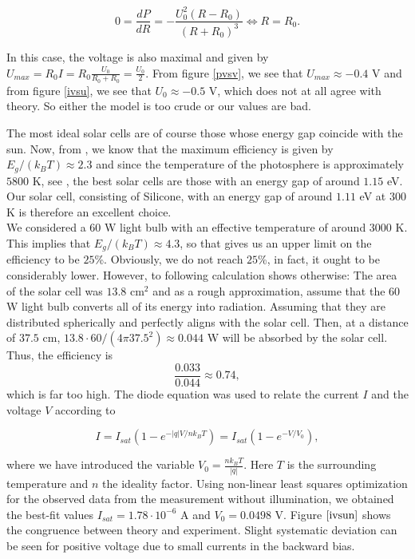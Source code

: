 \documentclass[12pt,a4paper]{article}
\begin{document}
\begin{displaymath}
  0=\frac{dP}{dR}=-\frac{U_0^2(R-R_0)}{(R+R_0)^3}\iff R=R_0.
\end{displaymath}

In this case, the voltage is also maximal and given by $U_{max}=R_0I=R_0\frac{U_0}{R_0+R_0}=\frac{U_0}{2}$.
From figure \ref{pvsv}, we see that $U_{max}\approx -0.4$ V and from figure \ref{ivsu}, we see that $U_0\approx -0.5$ V, which does not at all agree with theory. So either the model is too crude or our values are bad.

The most ideal solar cells are of course those whose energy gap coincide with the sun. Now, from \cite{lab_PM}, we know that the maximum efficiency is given by $E_g/(k_BT)\approx 2.3$ and since the temperature of the photosphere is approximately $5800$ K, see \cite{sun}, the best solar cells are those with an energy gap of around $1.15$ eV.
Our solar cell, consisting of Silicone, with an energy gap of around $1.11$ eV at $300$ K is therefore an excellent choice. \\

We considered a $60$ W light bulb with an effective temperature of around $3000$ K. This implies that $E_g/(k_B T)\approx 4.3$, so that \cite{lab_PM} gives us an upper limit on the efficiency to be $25$\%.
Obviously, we do not reach $25$\%, in fact, it ought to be considerably lower. However, to following calculation shows otherwise:
The area of the solar cell was $13.8$ cm${}^2$ and as a rough approximation, assume that the $60$ W light bulb converts all of its energy into radiation. Assuming that they are distributed spherically and perfectly aligns with the solar cell. Then, at a distance of $37.5$ cm, $13.8\cdot 60/(4\pi 37.5^2)\approx 0.044$ W will be absorbed by the solar cell.
Thus, the efficiency is
\begin{displaymath}
  \frac{0.033}{0.044}\approx 0.74,
\end{displaymath}
which is far too high.
The diode equation was used to relate the current $I$ and the voltage $V$ according to

$$I = I_{sat}\left(1-e^{-|q|V/nk_BT}\right) = I_{sat}\left(1-e^{-V/V_0}\right),$$

where we have introduced the variable $V_0 = \frac{nk_BT}{|q|}$. Here $T$ is the surrounding temperature and $n$ the ideality factor. Using non-linear least squares optimization for the observed data from the measurement without illumination, we obtained the best-fit values $I_{sat}=1.78\cdot 10^{-6}$ A and $V_0=0.0498$ V. Figure $\ref{ivsun}$ shows the congruence between theory and experiment. Slight systematic deviation can be seen for positive voltage due to small currents in the backward bias. \\
\end{document}
